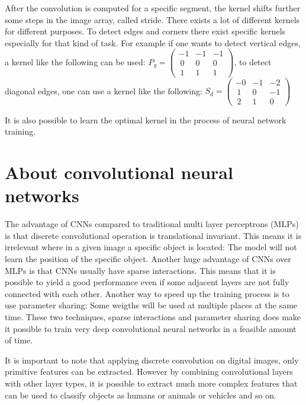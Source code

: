 After the convolution is computed for a specific segment, the kernel shifts further some steps in the image array, called stride. There exists a lot of different kernels for different purposes. To detect edges and corners there exist specific kernels especially for that kind of task. For example if one wants to detect vertical edges, a kernel like the following can be used:
$P_y = \begin{pmatrix}-1 & -1 & -1 \\\ 0 & 0 & 0 \\\ 1 & 1 & 1\end{pmatrix}$, \vspace{0.5cm} to detect diagonal edges, one can use a kernel like the following:
$S_d = \begin{pmatrix}-0 & -1 & -2 \\\ 1 & 0 & -1 \\\ 2 & 1 & 0\end{pmatrix}$ \vspace{0.5cm}

It is also possible to learn the optimal kernel in the process of neural network training.

\section{About convolutional neural networks}

The advantage of CNNs compared to traditional multi layer perceptrons (MLPs) is that discrete convolutional operation is translational invariant. This means it is irrelevant where in a given image a specific object is located: The model will not learn the position of the specific object. Another huge advantage of CNNs over MLPs is that CNNs usually have sparse interactions. This means that it is possible to yield a good performance even if some adjacent layers are not fully connected with each other. Another way to speed up the training process is to use parameter sharing: Some weigths will be used at multiple places at the same time. These two techniques, sparse interactions and parameter sharing does make it possible to train very deep convolutional neural networks in a feasible amount of time.

It is important to note that applying discrete convolution on digital images, only primitive features can be extracted. However by combining convolutional layers with other layer types, it is possible to extract much more complex features that can be used to classify objects as humans or animals or vehicles and so on.

